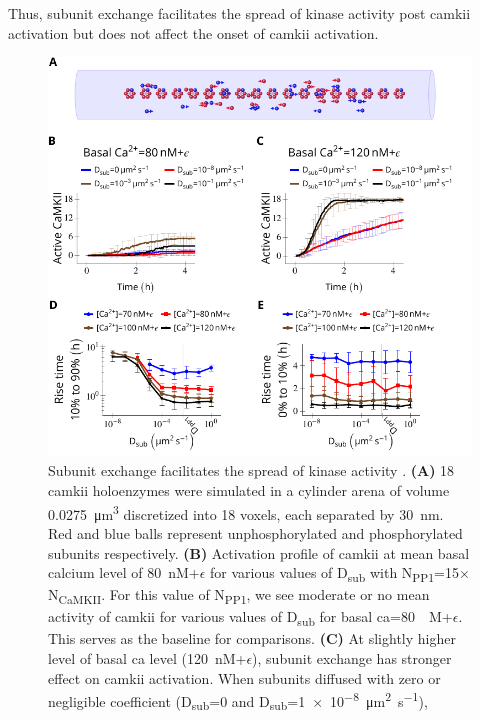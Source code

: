 \documentclass[9pt,lineno,doublespacing]{elife}
\newcommand\SUB[2]{#1\textsubscript{#2}}
\begin{document}
Thus, subunit exchange facilitates the spread of kinase activity post
\gls{camkii} activation but does not affect the onset of \gls{camkii}
activation.

\begin{figure}
    \includegraphics[width=0.95\linewidth]{./PaperFigures/elifeFigure4/figure_camkii_activation_130mm.pdf}
    \caption{Subunit exchange facilitates the spread of kinase activity
        \citep{stratton_activation-triggered_2014}. \textbf{(A)} 18 \gls{camkii}
        holoenzymes were simulated in a cylinder arena of volume
        \SI{0.0275}{\cubic\micro\meter} discretized into 18 voxels, each
        separated by \SI{30}{\nano\meter}. Red and blue balls represent
        unphosphorylated and phosphorylated subunits respectively.
        \textbf{(B)} Activation profile of \gls{camkii} at mean basal calcium
        level of \SI{80}{\nano M}+$\epsilon$ for various values of \SUB{D}{sub}
        with \SUB{N}{PP1}=15$\times$\SUB{N}{CaMKII}. For this value of
        \SUB{N}{PP1}, we see moderate or no mean activity of \gls{camkii} for
        various values of \SUB{D}{sub} for basal \gls{ca}=\SI{80}{\nano
        M}+$\epsilon$. This serves as the baseline for comparisons.
        \textbf{(C)} At slightly higher level of basal \gls{ca} level
        (\SI{120}{\nano M}+$\epsilon$), subunit exchange has stronger effect on
        \gls{camkii} activation. When subunits diffused with zero or negligible
        coefficient (\SUB{D}{sub}=0 and \SUB{D}{sub}=\SI{1e-8}{\micro\meter\squared\per\second}), 
}
\end{figure}
\end{document}
